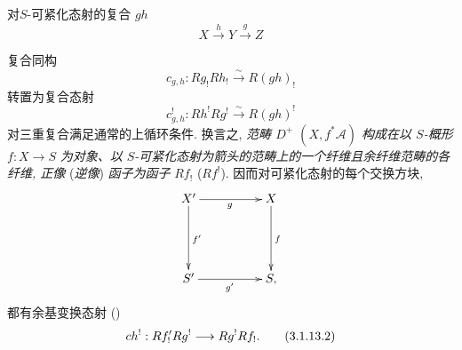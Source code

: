\setcounter{subsubsection}{12}
\subsubsection{}
对\pageoriginale $S$-可紧化态射的复合 $gh$
$$
X\xrightarrow{h}Y\xrightarrow{g}Z
$$

复合同构
$$
c_{g,h}:Rg_{!}Rh_{!}\xrightarrow{\sim} R(gh)_{!}
$$
转置为复合态射
\begin{equation*}
c^{!}_{g,h}:Rh^{!}Rg^{!}\xrightarrow{\sim} R(gh)^{!}\tag{3.1.13.1}
\end{equation*}%
对三重复合满足通常的上循环条件. 换言之, \emph{范畴 $D^{+}$ $(X,f^{\ast}\mathcal{A})$ 构成在以 $S$-概形} $f:X\rightarrow S$ \emph{为对象、以 $S$-可紧化态射为箭头的范畴上的一个纤维且余纤维范畴的各纤维, 正像} (\resp \emph{逆像}) \emph{函子为函子} $Rf_{!}$ (\resp $Rf^{!}$). 因而对可紧化态射的每个交换方块,
$$
\xymatrix@=1.75cm{
X' \ar[r]_{g} \ar[d]^{f'}& X \ar[d]^{f}\\
S' \ar[r]_{g'}& S,
}
$$
都有余基变换态射 ()
\begin{equation*}
ch^{!}:Rf'_{!}Rg^{!}\longrightarrow Rg^{!} Rf_{!}{}.\tag{3.1.13.2}
\end{equation*}


